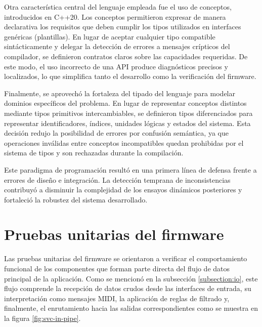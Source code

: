 Otra característica central del lenguaje empleada fue el uso de conceptos, introducidos en C++20. Los conceptos permitieron expresar de manera declarativa los requisitos que deben cumplir los tipos utilizados en interfaces genéricas (plantillas). En lugar de aceptar cualquier tipo compatible sintácticamente y delegar la detección de errores a mensajes crípticos del compilador, se definieron contratos claros sobre las capacidades requeridas. De este modo, el uso incorrecto de una API produce diagnósticos precisos y localizados, lo que simplifica tanto el desarrollo como la verificación del firmware.

Finalmente, se aprovechó la fortaleza del tipado del lenguaje para modelar dominios específicos del problema. En lugar de representar conceptos distintos mediante tipos primitivos intercambiables, se definieron tipos diferenciados para representar identificadores, índices, unidades lógicas y estados del sistema. Esta decisión redujo la posibilidad de errores por confusión semántica, ya que operaciones inválidas entre conceptos incompatibles quedan prohibidas por el sistema de tipos y son rechazadas durante la compilación.

Este paradigma de programación resultó en una primera línea de defensa frente a errores de diseño e integración. La detección temprana de inconsistencias contribuyó a disminuir la complejidad de los ensayos dinámicos posteriores y fortaleció la robustez del sistema desarrollado.



\section{Pruebas unitarias del firmware} %

Las pruebas unitarias del firmware se orientaron a verificar el comportamiento funcional de los componentes que forman parte directa del flujo de datos principal de la aplicación. Como se mencionó en la subsección \ref{subsection:io}, este flujo comprende la recepción de datos crudos desde las interfaces de entrada, su interpretación como mensajes MIDI, la aplicación de reglas de filtrado y, finalmente, el enrutamiento hacia las salidas correspondientes como se muestra en la figura \ref{fig:svc-in-pipe}.

